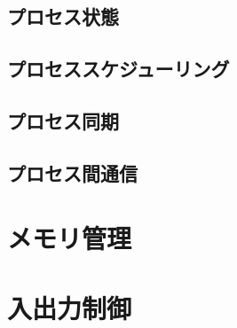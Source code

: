 \subsection{プロセス状態}

\subsection{プロセススケジューリング}

\subsection{プロセス同期}

\subsection{プロセス間通信}

\section{メモリ管理}

\section{入出力制御}

\newpage